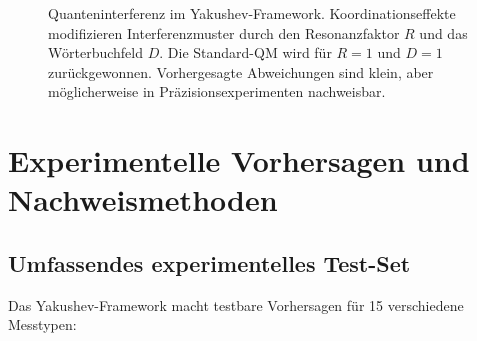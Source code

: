 \documentclass[11pt,a4paper]{article}
\begin{document}
\begin{figure}[htbp]
{
		}
		\caption{Quanteninterferenz im Yakushev-Framework. Koordinationseffekte modifizieren Interferenzmuster durch den Resonanzfaktor $R$ und das Wörterbuchfeld $D$. Die Standard-QM wird für $R=1$ und $D=1$ zurückgewonnen. Vorhergesagte Abweichungen sind klein, aber möglicherweise in Präzisionsexperimenten nachweisbar.}
		\label{fig:quantum-interference}
	\end{figure}
	
	\section{Experimentelle Vorhersagen und Nachweismethoden}
	\subsection{Umfassendes experimentelles Test-Set}
	
	Das Yakushev-Framework macht testbare Vorhersagen für 15 verschiedene Messtypen:
	
\end{document}
